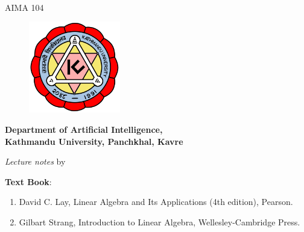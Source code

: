 \vspace*{2cm}
{\begin{center}
  {\Huge
    {\bfseries {\thetitle}}} \\
        \vspace{5mm}
        {\large AIMA 104}
  \vspace{3cm}

\begin{figure}[h]
	\centering
	\includegraphics[height=4cm,width=4cm]{images/Kulogo.png}
\end{figure}

\vspace{1cm}

	{\large \bfseries Department of Artificial Intelligence, \\[1mm]
 Kathmandu University, Panchkhal, Kavre}

\vspace{2cm}
        \textit{Lecture notes}
	by\\
	{\bfseries  \theauthor}

\vspace{1cm}

\textbf{Text Book}:
\begin{enumerate}
\item David C. Lay, Linear Algebra and Its Applications (4th edition), Pearson.
\item Gilbart Strang, Introduction to Linear Algebra, Wellesley-Cambridge Press.
\end{enumerate}
    \vspace{1.5cm}

{\thedate}

\thispagestyle{empty}
\end{center}}


\clearpage
